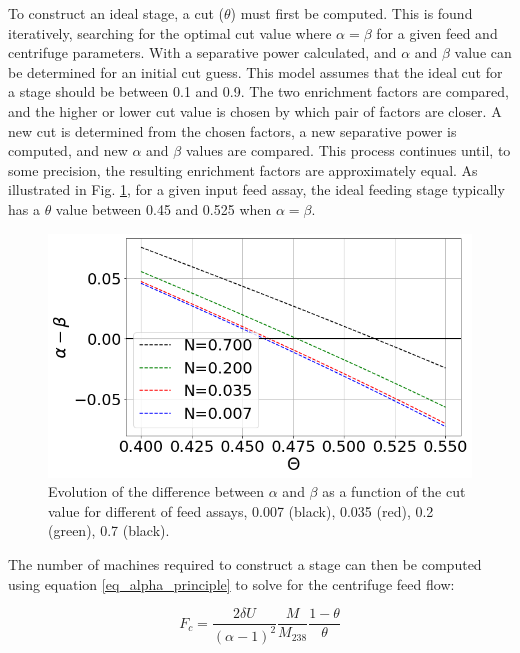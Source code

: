 To construct an ideal stage, a cut ($\theta$) must first be computed.
This is found iteratively, searching for the optimal cut value where $\alpha = \beta$
for a given feed and centrifuge parameters. With a separative power calculated,
and $\alpha$ and $\beta$ value can be determined for an initial cut guess. This
model assumes that the ideal cut for a stage should be between 0.1 and 0.9. The
two enrichment factors are compared, and the higher or lower cut value is chosen
by which pair of factors are closer. A new cut is determined from the chosen
factors, a new separative power is computed, and new $\alpha$ and $\beta$ values
are compared. This process continues until, to some precision, the resulting
enrichment factors are approximately equal. As illustrated in Fig. \ref{fig_a_m_b},
for a given input feed assay, the ideal feeding stage typically has a $\theta$
value between 0.45 and 0.525 when $\alpha = \beta$.

\begin{figure}[h!] %
    \centering
    \includegraphics[scale=0.5]{alpha_minus_beta}
    \caption{Evolution of the difference between $\alpha$ and $\beta$ as a
    function of the cut value for different of feed assays, 0.007 (black),
    0.035 (red), 0.2 (green), 0.7 (black). }
    \label{fig_a_m_b}
\end{figure}

The number of machines required to construct a stage can then be computed using
equation \eqref{eq_alpha_principle} to solve for the centrifuge feed flow:

\begin{equation}\label{eq_cent_feed}
    F_c = \frac{2 \delta U}{(\alpha - 1)^2} \frac{M}{M_{238}} \frac{1-\theta}{\theta}
\end{equation}


